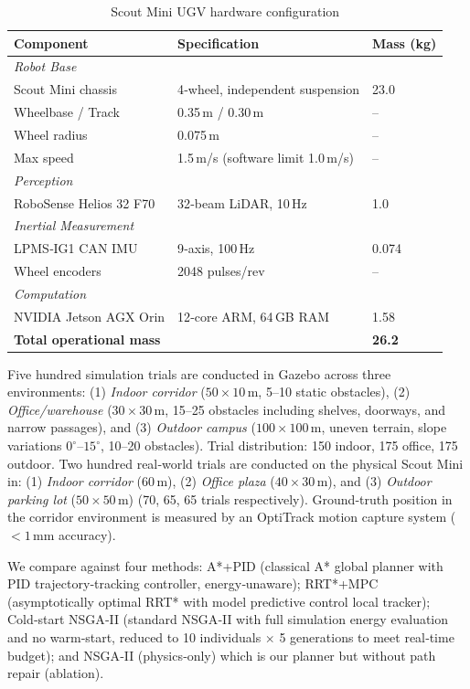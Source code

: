 \documentclass[lettersize,journal]{IEEEtran}
\begin{document}
\begin{table}[t]
\centering
\caption{Scout Mini UGV hardware configuration}
\label{tab:hardware}
\begin{tabular}{lll}
\toprule
\textbf{Component} & \textbf{Specification} & \textbf{Mass (kg)} \\
\midrule
\multicolumn{3}{l}{\textit{Robot Base}} \\
\quad Scout Mini chassis & 4‑wheel, independent suspension & 23.0 \\
\quad Wheelbase / Track & 0.35\,m / 0.30\,m & -- \\
\quad Wheel radius & 0.075\,m & -- \\
\quad Max speed & 1.5\,m/s (software limit 1.0\,m/s) & -- \\
\midrule
\multicolumn{3}{l}{\textit{Perception}} \\
\quad RoboSense Helios 32 F70 & 32‑beam LiDAR, 10\,Hz & 1.0 \\
\midrule
\multicolumn{3}{l}{\textit{Inertial Measurement}} \\
\quad LPMS‑IG1 CAN IMU & 9‑axis, 100\,Hz & 0.074 \\
\quad Wheel encoders & 2048 pulses/rev & -- \\
\midrule
\multicolumn{3}{l}{\textit{Computation}} \\
\quad NVIDIA Jetson AGX Orin & 12‑core ARM, 64\,GB RAM & 1.58 \\
\midrule
\textbf{Total operational mass} & & \textbf{26.2} \\
\bottomrule
\end{tabular}
\end{table}

Five hundred simulation trials are conducted in Gazebo across three
environments: (1) \emph{Indoor corridor} ($50\times10$\,m, 5--10 static
obstacles), (2) \emph{Office/warehouse} ($30\times30$\,m, 15--25 obstacles
including shelves, doorways, and narrow passages), and (3) \emph{Outdoor
campus} ($100\times100$\,m, uneven terrain, slope variations
$0^\circ$--$15^\circ$, 10--20 obstacles). Trial distribution: 150 indoor, 175
office, 175 outdoor. Two hundred real‑world trials are conducted on the
physical Scout Mini in: (1) \emph{Indoor corridor} (60\,m),
(2) \emph{Office plaza} ($40\times30$\,m), and (3) \emph{Outdoor parking lot}
($50\times50$\,m) (70, 65, 65 trials respectively). Ground‑truth position in
the corridor environment is measured by an OptiTrack motion capture system
($<1$\,mm accuracy).

We compare against four methods: A*+PID (classical A* global planner with PID
trajectory‑tracking controller, energy‑unaware); RRT*+MPC (asymptotically
optimal RRT* with model predictive control local tracker); Cold‑start NSGA‑II
(standard NSGA‑II with full simulation energy evaluation and no warm‑start,
reduced to 10 individuals $\times$ 5 generations to meet real‑time budget);
and NSGA‑II (physics‑only) which is our planner but without path repair
(ablation).
\end{document}
